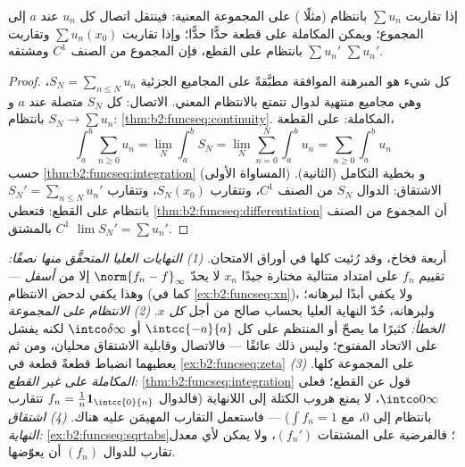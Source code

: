 \begin{theorem}\label{thm:b2:funcseq:seriestransfer}
إذا تقاربت $\sum u_n$ بانتظام (مثلًا ) على المجموعة
المعنية: فينتقل اتصال كل $u_n$ عند $a$ إلى المجموع؛ ويمكن المكاملة
على قطعة حدًّا حدًّا؛ وإذا تقاربت $\sum u_n(x_0)$
وتقاربت $\sum u_n'$ بانتظام على القطع، فإن
المجموع من الصنف $C^1$ ومشتقه $\sum u_n'$.
\end{theorem}

\begin{proof}
كل شيء هو المبرهنة الموافقة مطبَّقةً على المجاميع
الجزئية $S_N = \sum_{n\leq N}u_n$، وهي مجاميع منتهية لدوال
تتمتع بالانتظام المعني. الاتصال: كل $S_N$
متصلة عند $a$ و$S_N \to \sum u_n$ بانتظام:
\cref{thm:b2:funcseq:continuity}. المكاملة: على القطعة،
\[
\int_a^b \sum_{n\geq0} u_n
= \lim_N \int_a^b S_N
= \lim_N \sum_{n=0}^{N}\int_a^b u_n
= \sum_{n\geq0}\int_a^b u_n
\]
حسب \cref{thm:b2:funcseq:integration} (المساواة الأولى) و
بخطية التكامل (الثانية). الاشتقاق: الدوال
$S_N$ من الصنف $C^1$، وتتقارب $S_N(x_0)$، وتتقارب $S_N' =
\sum_{n\leq N}u_n'$ بانتظام على القطع:
فتعطي \cref{thm:b2:funcseq:differentiation} أن المجموع
من الصنف $C^1$ بالمشتق $\lim S_N' = \sum u_n'$.
\end{proof}

\begin{remark}
أربعة فخاخ، وقد رُئيت كلها في أوراق الامتحان. \emph{(1)
النهايات العليا المتحقَّق منها نصفًا:} تقييم $f_n$ على امتداد متتالية
مختارة جيدًا $x_n$ لا يحدّ $\norm{f_n - f}_\infty$ إلا
من \emph{أسفل} --- وهذا يكفي لدحض الانتظام (كما في
\cref{ex:b2:funcseq:xn})، ولا يكفي أبدًا لبرهانه؛ ولبرهانه، حُدّ
النهاية العليا بحساب صالح من أجل \emph{كل} $x$. \emph{(2)
الانتظام على المجموعة الخطأ:} كثيرًا ما يصحّ  أو المنتظم
على كل $\intcc{-a}{a}$ أو $\intco\delta\infty$
لكنه يفشل على الاتحاد المفتوح؛ وليس ذلك عائقًا --- فالاتصال
وقابلية الاشتقاق محليان، ومن ثم يعطيهما انضباط قطعةً قطعة
في \cref{ex:b2:funcseq:zeta} على المجموعة  كلها. \emph{(3)
المكاملة على غير القطع:}
\cref{thm:b2:funcseq:integration} قول عن
القطع؛ فعلى $\intco0\infty$، لا يمنع 
هروب الكتلة إلى اللانهاية (فالدوال $f_n =
\frac1n\mathbf 1_{\intcc{0}{n}}$ تتقارب بانتظام إلى $0$،
مع $\int f_n = 1$) --- فاستعمل التقارب المهيمَن عليه هناك.
\emph{(4) اشتقاق النهاية:}
\cref{ex:b2:funcseq:sqrtabs}؛ فالفرضية على المشتقات $(f_n')$، ولا يمكن لأي معدل تقارب للدوال $(f_n)$ أن يعوّضها.
\end{remark}

